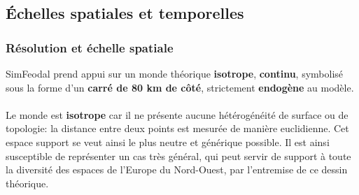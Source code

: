 

\clearpage
\subsection{Échelles spatiales et temporelles}

\subsubsection{Résolution et échelle spatiale \label{subsec:reso-spatiale}}

SimFeodal prend appui sur un monde théorique \textbf{isotrope}, \textbf{continu}, symbolisé sous la forme d'un \textbf{carré de 80 km de côté}, strictement \textbf{endogène} au modèle.

\paragraph[Isotrope]{} Le monde est \textbf{isotrope} car il ne présente aucune hétérogénéité de surface ou de topologie: la distance entre deux points est mesurée de manière euclidienne.
Cet espace support se veut ainsi le plus neutre et générique possible.
Il est ainsi susceptible de représenter un cas très général, qui peut servir de support à toute la diversité des espaces de l'Europe du Nord-Ouest, par l'entremise de ce dessin théorique.

